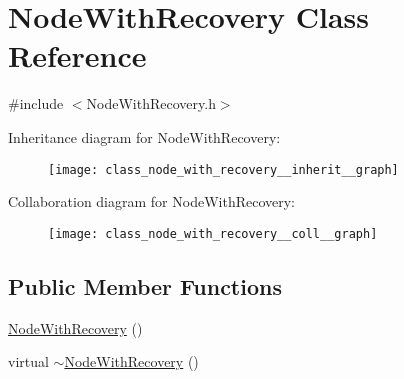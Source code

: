 \hypertarget{class_node_with_recovery}{}\section{Node\+With\+Recovery Class Reference}
\label{class_node_with_recovery}


{\ttfamily \#include $<$Node\+With\+Recovery.\+h$>$}



Inheritance diagram for Node\+With\+Recovery\+:
\nopagebreak
\begin{figure}[H]
\begin{center}
\leavevmode
\texttt{[image: class\_node\_with\_recovery\_\_inherit\_\_graph]}
\end{center}
\end{figure}


Collaboration diagram for Node\+With\+Recovery\+:
\nopagebreak
\begin{figure}[H]
\begin{center}
\leavevmode
\texttt{[image: class\_node\_with\_recovery\_\_coll\_\_graph]}
\end{center}
\end{figure}
\subsection*{Public Member Functions}
\begin{DoxyCompactItemize}
\item 
\hyperlink{class_node_with_recovery_aed1d9b2cfa7729902c90c103ab3075ff}{Node\+With\+Recovery} ()
\item 
virtual \hyperlink{class_node_with_recovery_a5cb1367a800cf960b96c9011ab94a616}{$\sim$\+Node\+With\+Recovery} ()
\end{DoxyCompactItemize}
